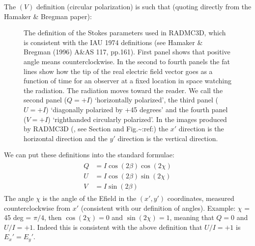 \documentclass[letterpaper,10pt,english]{sphinxmanual}
\begin{document}
The \((V)\) definition (circular polarization) is such that (quoting
directly from the Hamaker \& Bregman paper): 

\begin{figure}[htbp]
\centering
\capstart

\noindent{}
\caption{The definition of the Stokes parameters used in RADMC\sphinxhyphen{}3D, which is consistent
with the IAU 1974 definitions (see Hamaker \& Bregman (1996) A\&AS 117,
pp.161). First panel shows that positive angle means counter\sphinxhyphen{}clockwise. In
the second to fourth panels the fat lines show how the tip of the real
electric field vector goes as a function of time for an observer at a fixed
location in space watching the radiation. The radiation moves toward the
reader. We call the second panel (\(Q=+I\)) ‘horizontally polarized’, the
third panel (\(U=+I\)) ‘diagonally polarized by +45 degrees’ and the
fourth panel (\(V=+I\)) ‘right\sphinxhyphen{}handed circularly polarized’. In the
images produced by RADMC\sphinxhyphen{}3D (, see Section {\hyperref[\detokenize{inputoutputfiles:sec-image-out}]{}}
and Fig.\textasciitilde{}:ref:) the \(x'\) direction is the horizontal
direction and the \(y'\) direction is the vertical direction.}\label{\detokenize{dustradtrans:id2}}\label{\detokenize{dustradtrans:fig-stokes-definition}}\end{figure}

We can put these definitions into the standard formulae:
\begin{equation*}
\begin{split}\begin{split}
Q &= I\cos(2\beta)\cos(2\chi)\\
U &= I\cos(2\beta)\sin(2\chi)\\
V &= I\sin(2\beta)
\end{split}\end{split}
\end{equation*}
The angle \(\chi\) is the angle of the E\sphinxhyphen{}field in the \((x',y')\)
coordinates, measured counter\sphinxhyphen{}clockwise from \(x'\) (consistent with our
definition of angles). Example: \(\chi\) = 45 deg = \(\pi/4\), then
\(\cos(2\chi)=0\) and \(\sin(2\chi)=1\), meaning that \(Q=0\) and
\(U/I=+1\). Indeed this is consistent with the above definition that
\(U/I=+1\) is \(E_x'=E_y'\).
\end{document}
